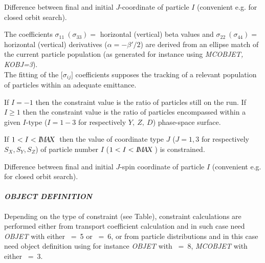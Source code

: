  Difference between final and initial $J$-coordinate of particle $I$ (convenient 
e.g. for closed orbit search). 

\smallskip


 The coefficients 
$ \sigma_{11}~(\sigma_{ 33}) = $ horizontal (vertical) beta values and 
$ \sigma_{ 22}~(\sigma_{ 44}) = $ horizontal (vertical) derivatives ($\alpha = -\beta'/2$) 
are derived from an ellipse match of the current particle population (as generated for instance using 
\textsl{MCOBJET, KOBJ=3}).\\
%
The fitting of the $ \lbrack \sigma_{ij}\rbrack $ 
coefficients supposes the tracking of a relevant population of particles within an 
adequate emittance.  

\smallskip

 If $I=-1$ then  the constraint value is the ratio of particles still on the run. 
If $I\ge 1$ then the constraint value is the ratio of  particles encompassed within a given $I$-type 
($I=1-3$ for respectively $Y,~Z,~D$) phase-space surface. 

\smallskip

 If $1<I<\textsl{I\!M\!A\!X }$ then the value of coordinate type $J$ ($J=1,3$ for respectively 
 $S_X, S_Y, S_Z$) of particle number $I$ ($1<I<\textsl{I\!M\!A\!X }$) is constrained.  

\smallskip

 Difference between final and initial $J$-spin coordinate  of particle $I$ (convenient 
e.g. for closed orbit search). 





\paragraph{\textit{OBJECT DEFINITION}}


Depending on the type of constraint (see Table), constraint calculations are performed either from 
transport coefficient calculation and in such case need  \textsl{OBJET} with either \KOBJ~=~5  
or  \KOBJ~=~6, or from particle distributions and in this case need  object definition using for 
instance \textsl{OBJET} with \KOBJ~=~8,    \textsl{MCOBJET} with either \KOBJ~=~3. 



